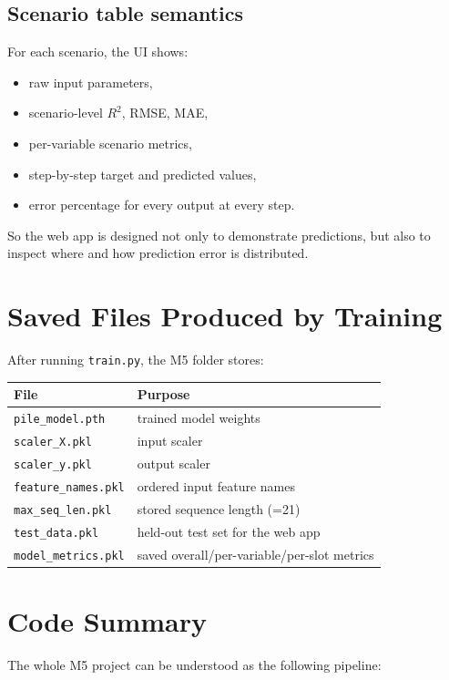 \documentclass[11pt,a4paper]{article}
\begin{document}
\subsection*{Scenario table semantics}
For each scenario, the UI shows:
\begin{itemize}[nosep]
    \item raw input parameters,
    \item scenario-level $R^2$, RMSE, MAE,
    \item per-variable scenario metrics,
    \item step-by-step target and predicted values,
    \item error percentage for every output at every step.
\end{itemize}

So the web app is designed not only to demonstrate predictions, but also to inspect where and how prediction error is distributed.

\section{Saved Files Produced by Training}

After running \texttt{train.py}, the M5 folder stores:

\begin{center}
\begin{tabular}{@{}ll@{}}
\toprule
File & Purpose \\
\midrule
\texttt{pile\_model.pth} & trained model weights \\
\texttt{scaler\_X.pkl} & input scaler \\
\texttt{scaler\_y.pkl} & output scaler \\
\texttt{feature\_names.pkl} & ordered input feature names \\
\texttt{max\_seq\_len.pkl} & stored sequence length (=21) \\
\texttt{test\_data.pkl} & held-out test set for the web app \\
\texttt{model\_metrics.pkl} & saved overall/per-variable/per-slot metrics \\
\bottomrule
\end{tabular}
\end{center}

\section{Code Summary}

The whole M5 project can be understood as the following pipeline:
\end{document}
